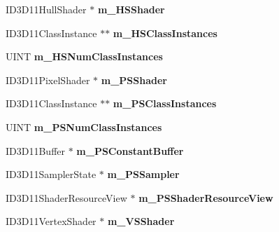 \begin{DoxyCompactItemize}
\item 
\hypertarget{struct_c_state11_a0cdd2ad2ad85a7aa23d1c749c6133545}{I\+D3\+D11\+Hull\+Shader $\ast$ {\bfseries m\+\_\+\+H\+S\+Shader}}\label{struct_c_state11_a0cdd2ad2ad85a7aa23d1c749c6133545}

\item 
\hypertarget{struct_c_state11_a335f72806a0fd691824530d2d8bd6a12}{I\+D3\+D11\+Class\+Instance $\ast$$\ast$ {\bfseries m\+\_\+\+H\+S\+Class\+Instances}}\label{struct_c_state11_a335f72806a0fd691824530d2d8bd6a12}

\item 
\hypertarget{struct_c_state11_a0316e3a7d2ea83ab14905c8c1150c2d5}{U\+I\+N\+T {\bfseries m\+\_\+\+H\+S\+Num\+Class\+Instances}}\label{struct_c_state11_a0316e3a7d2ea83ab14905c8c1150c2d5}

\item 
\hypertarget{struct_c_state11_aea403bfd93d9f73fee094648ce873733}{I\+D3\+D11\+Pixel\+Shader $\ast$ {\bfseries m\+\_\+\+P\+S\+Shader}}\label{struct_c_state11_aea403bfd93d9f73fee094648ce873733}

\item 
\hypertarget{struct_c_state11_a4074dee0eae0fa003cad04333394df54}{I\+D3\+D11\+Class\+Instance $\ast$$\ast$ {\bfseries m\+\_\+\+P\+S\+Class\+Instances}}\label{struct_c_state11_a4074dee0eae0fa003cad04333394df54}

\item 
\hypertarget{struct_c_state11_a1dbf868af21b1efd0694cad242629a74}{U\+I\+N\+T {\bfseries m\+\_\+\+P\+S\+Num\+Class\+Instances}}\label{struct_c_state11_a1dbf868af21b1efd0694cad242629a74}

\item 
\hypertarget{struct_c_state11_a94042a75a59d92264d9e37c4deee3806}{I\+D3\+D11\+Buffer $\ast$ {\bfseries m\+\_\+\+P\+S\+Constant\+Buffer}}\label{struct_c_state11_a94042a75a59d92264d9e37c4deee3806}

\item 
\hypertarget{struct_c_state11_af811ed64c71b264ec5906336f18567fc}{I\+D3\+D11\+Sampler\+State $\ast$ {\bfseries m\+\_\+\+P\+S\+Sampler}}\label{struct_c_state11_af811ed64c71b264ec5906336f18567fc}

\item 
\hypertarget{struct_c_state11_a57456c9d7fe544ef9a5dcf8e94f98921}{I\+D3\+D11\+Shader\+Resource\+View $\ast$ {\bfseries m\+\_\+\+P\+S\+Shader\+Resource\+View}}\label{struct_c_state11_a57456c9d7fe544ef9a5dcf8e94f98921}

\item 
\hypertarget{struct_c_state11_a5f15402ad856207e283161d69517276c}{I\+D3\+D11\+Vertex\+Shader $\ast$ {\bfseries m\+\_\+\+V\+S\+Shader}}\label{struct_c_state11_a5f15402ad856207e283161d69517276c}


\end{DoxyCompactItemize}
